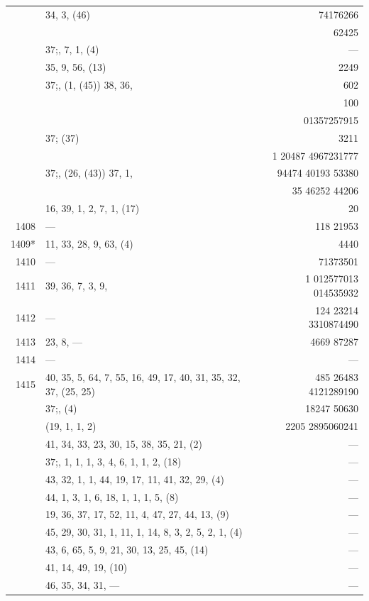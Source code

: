 \documentclass[11pt]{article}
\begin{document}
{\begin{longtable}{|r|p{8.5cm}|r|}
\hline
       & 34, 3, (46) & 74176266 \\
       & & 62425 \\
       & $37$;\; 2, 7, 1, (4) & --- \\
       & 35, 9, 56, (13) & 2249 \\
\hline
       & $37$;\; 2, (1, (45)) 38, 36, & 602 \\
       & & 100 \\
       & & 01357257915 \\
       & $37$;\; (37) & 3211 \\
       & & 1 20487 4967231777 \\
       & $37$;\; 1, (26, (43)) 37, 1, & 94474 40193 53380 \\
       & & 35 46252 44206 \\
       & 16, 39, 1, 2, 7, 1, (17) & 20 \\
1408   & --- & 118 21953 \\
1409*  & 11, 33, 28, 9, 63, (4) & 4440 \\
1410   & --- & 71373501 \\
1411   & 39, 36, 7, 3, 9, & 1 012577013 014535932 \\
1412   & --- & 124 23214 3310874490 \\
1413   & 23, 8, --- & 4669 87287 \\
1414   & --- & --- \\
1415   & 40, 35, 5, 64, 7, 55, 16, 49, 17, 40, 31, 35, 32, 37, (25, 25) & 485 26483 4121289190 \\
       & $37$;\; 1, (4) & 18247 50630 \\
       & (19, 1, 1, 2) & 2205 2895060241 \\
       & 41, 34, 33, 23, 30, 15, 38, 35, 21, (2) & --- \\
       & $37$;\; 42, 1, 1, 1, 3, 4, 6, 1, 1, 2, (18) & --- \\
       & 43, 32, 1, 1, 44, 19, 17, 11, 41, 32, 29, (4) & --- \\
       & 44, 1, 3, 1, 6, 18, 1, 1, 1, 5, (8) & --- \\
       & 19, 36, 37, 17, 52, 11, 4, 47, 27, 44, 13, (9) & --- \\
       & 45, 29, 30, 31, 1, 11, 1, 14, 8, 3, 2, 5, 2, 1, (4) & --- \\
       & 43, 6, 65, 5, 9, 21, 30, 13, 25, 45, (14) & --- \\
       & 41, 14, 49, 19, (10) & --- \\
       & 46, 35, 34, 31, --- & --- \\
\hline
\end{longtable}
}
\end{document}
